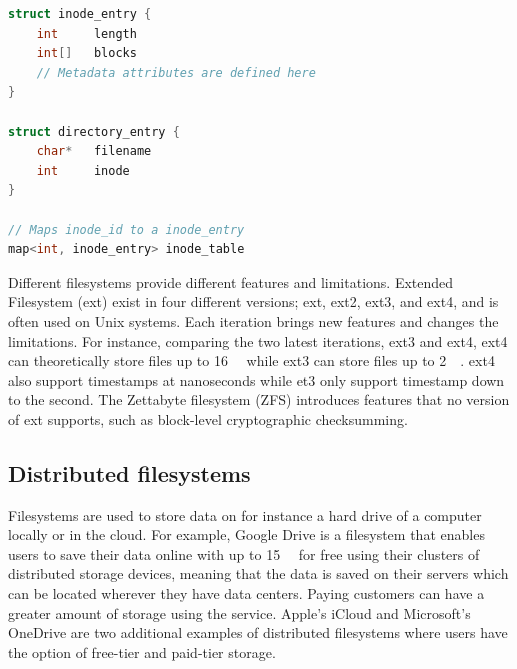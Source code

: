 \begin{minipage}{\linewidth}
\begin{lstlisting}[language=c, caption={Pseudocode of a minimalistic inode filesystem structure}, label=lst:inode_fs]
struct inode_entry {
	int 	length
	int[]	blocks
	// Metadata attributes are defined here
}

struct directory_entry {
	char*   filename
	int     inode
}

// Maps inode_id to a inode_entry
map<int, inode_entry> inode_table

\end{lstlisting}
\end{minipage}

Different filesystems provide different features and limitations. Extended Filesystem (ext) exist in four different versions; ext, ext2, ext3, and ext4, and is often used on Unix systems. Each iteration brings new features and changes the limitations. For instance, comparing the two latest iterations, ext3 and ext4, ext4 can theoretically store files up to \SI{16}{\tebi\byte} while ext3 can store files up to \SI{2}{\tebi\byte}\cite{salterUnderstandingLinuxFilesystems2018}. ext4 also support timestamps at nanoseconds while et3 only support timestamp down to the second. The Zettabyte filesystem (ZFS) introduces features that no version of ext supports, such as block-level cryptographic checksumming.

\subsection{Distributed filesystems}
Filesystems are used to store data on for instance a hard drive of a computer locally or in the cloud. For example, Google Drive is a filesystem that enables users to save their data online with up to \SI{15}{\giga\byte} for free\cite{CloudStorageWork} using their clusters of distributed storage devices, meaning that the data is saved on their servers which can be located wherever they have data centers\cite{DistributedStorageWhat}. Paying customers can have a greater amount of storage using the service. Apple's iCloud and Microsoft's OneDrive are two additional examples of distributed filesystems where users have the option of free-tier and paid-tier storage.

